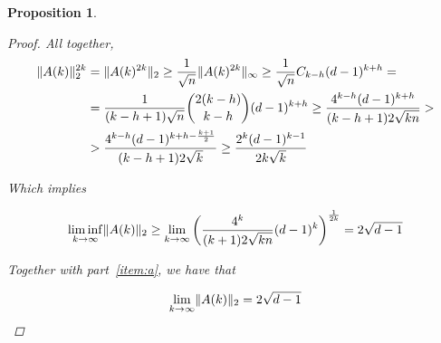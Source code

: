 \documentclass{amsart}
\theoremstyle{plain}
\newtheorem*{proposition}{\textbf{Proposition}}
\theoremstyle{definition}
\DeclarePairedDelimiter{\norm}{\lVert}{\rVert}
\begin{document}
\begin{proposition}
\begin{proof}
            All together,
            \begin{align*}
                    \norm{A(k)}_2^{2k}
                    & = \norm{A(k)^{2k}}_2
                    \geq \frac{1}{\sqrt{n}} \norm{A(k)^{2k}}_\infty
                    \geq \frac{1}{\sqrt{n}} C_{k-h} (d-1)^{k+h} = \\
                    & = \frac{1}{(k-h+1)\sqrt{n}} \binom{2(k-h)}{k-h} (d-1)^{k+h} \geq
                    \frac{4^{k-h}(d-1)^{k+h}}{(k-h+1)2\sqrt{kn}} > \\
                    & > \frac{4^{k-h}(d-1)^{k+h - \frac{k+1}{2}}}{(k-h+1)2\sqrt{k}} \geq
                    \frac{2^{k}(d-1)^{k-1}}{2 k \sqrt{k}}
            \end{align*}

            Which implies

            \begin{equation*}
                \liminf_{k \to \infty} \norm{A(k)}_2 \geq
                \lim_{k \to \infty} \left( \frac{4^k}{(k+1)2\sqrt{kn}} (d-1)^k \right)^{\frac{1}{2k}}
                = 2 \sqrt{d-1}
            \end{equation*}

            Together with part~\ref{item:a}, we have that

            \begin{equation*}
                \lim_{k \to \infty} \norm{A(k)}_2 = 2 \sqrt{d-1}
            \end{equation*}

        \end{proof}
    \end{proposition}
\end{document}
